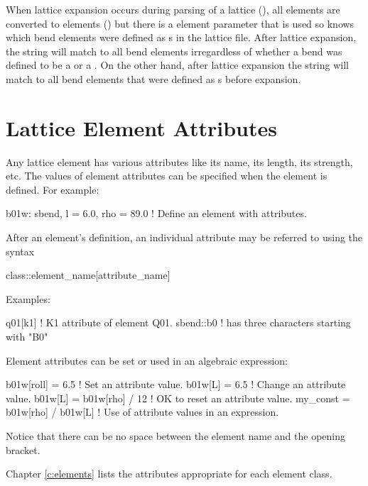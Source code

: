 {{{{{When lattice expansion occurs during parsing of a lattice (), all 
elements are converted to  elements () but there is a  element
parameter that is used so \bmad knows which bend elements were defined as s in the lattice
file. After lattice expansion, the string  will match to all bend elements irregardless
of whether a bend was defined to be a  or a . On the other hand, after lattice
expansion the string  will match to all bend elements that were defined as s
before expansion.

\section{Lattice Element Attributes}
\label{s:lat.attribs}

Any lattice element has various attributes like its name, its length,
its strength, etc. The values of element attributes can be
specified when the element is defined. For example:
\begin{example}
  b01w: sbend, l = 6.0, rho = 89.0 ! Define an element with attributes.
\end{example}
After an element's definition, an individual attribute may be referred
to using the syntax
\begin{example}
  class::element_name[attribute_name]
\end{example}
Examples:
\begin{example}
  q01[k1]                       ! K1 attribute of element Q01.
  sbend::b0%
                                !   has three characters starting with "B0"
\end{example}
Element attributes can be set or used in an algebraic expression:
\begin{example}
  b01w[roll] = 6.5                  ! Set an attribute value.
  b01w[L] = 6.5                     ! Change an attribute value.
  b01w[L] = b01w[rho] / 12          ! OK to reset an attribute value.
  my_const = b01w[rho] / b01w[L]    ! Use of attribute values in an expression.
\end{example}
Notice that there can be no space between the element name and the \vn{[} opening bracket.

Chapter \cref{c:elements} lists the attributes appropriate for each element class.

}}}}}

